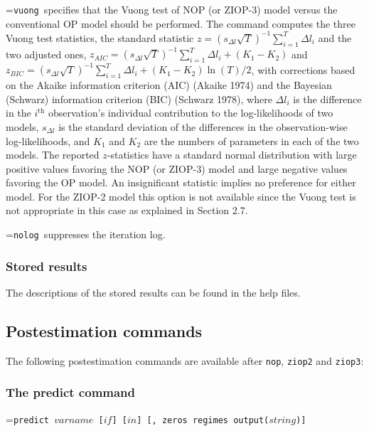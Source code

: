 \documentclass[letterpaper,fleqn,12pt]{article}
\begin{document}
\smallskip

\hangindent=\parindent\noindent \texttt{vuong }specifies that the Vuong test
of NOP (or ZIOP-3) model versus the conventional OP model should be
performed. The command computes the three Vuong test statistics, the
standard statistic $z=(s_{\Delta l}\sqrt{T})^{-1}\sum_{i=1}^{T}\Delta l_{i}$
and the two adjusted ones, $z_{AIC}=(s_{\Delta l}\sqrt{T})^{-1}%
\sum_{i=1}^{T}\Delta l_{i}+(K_{1}-K_{2})$ and $z_{BIC}=(s_{\Delta l}\sqrt{T}%
)^{-1}\sum_{i=1}^{T}\Delta l_{i}+(K_{1}-K_{2})\ln (T)/2$, with corrections
based on the Akaike information criterion (AIC) (Akaike 1974) and the
Bayesian (Schwarz) information criterion (BIC) (Schwarz 1978), where $\Delta
l_{i}$ is the difference in the $i^{\text{th}}$ observation's individual
contribution to the log-likelihoods of two models, $s_{\Delta l}$ is the
standard deviation of the differences in the observation-wise
log-likelihoods, and $K_{1}$ and $K_{2}$ are the numbers of parameters in
each of the two models. The reported $z$-statistics have a standard normal
distribution with large positive values favoring the NOP (or ZIOP-3) model
and large negative values favoring the OP model. An insignificant statistic
implies no preference for either model. For the ZIOP-2 model this option is
not available since the Vuong test is not appropriate in this case as
explained in Section 2.7.

\smallskip

\hangindent=\parindent\noindent \texttt{nolog }suppresses the iteration log.

\subsubsection*{Stored results}

The descriptions of the stored results can be found in the help files.

\subsection{Postestimation commands}

The following postestimation commands are available after \texttt{nop}, 
\texttt{ziop2} and \texttt{ziop3}:

\subsubsection*{The predict command}

\hangindent=\parindent\noindent \texttt{predict $varname$ [$if$] [$in$] [,
zeros regimes output($string$)]}
\end{document}

